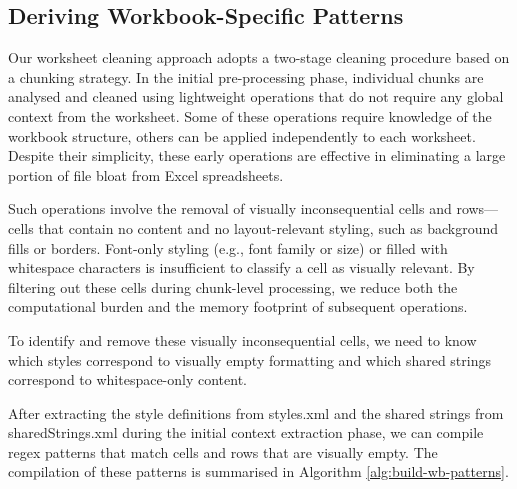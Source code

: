 \subsection{Deriving Workbook-Specific Patterns}
\label{sec:wb-patterns}


Our worksheet cleaning approach adopts a two-stage cleaning procedure based on a chunking strategy.
In the initial pre-processing phase, individual chunks are analysed
and cleaned using lightweight operations that do not require any global context
from the worksheet. Some of these operations require knowledge of the workbook structure,
others can be applied independently to each worksheet. Despite their simplicity,
these early operations are effective in eliminating a large portion of file bloat
from Excel spreadsheets.

Such operations involve the removal of visually inconsequential cells and rows—
cells that contain no content and no layout-relevant styling,
such as background fills or borders.
Font-only styling (e.g., font family or size) or filled  with
 whitespace characters  is insufficient to classify a cell as visually relevant.
By filtering out these cells during chunk-level processing,
we reduce both the computational burden and the memory footprint
of subsequent operations.

To identify and remove these visually inconsequential cells,
we need to know which styles correspond to visually empty formatting
and which shared strings correspond to whitespace-only content.

After extracting the style definitions from styles.xml
and the shared strings from sharedStrings.xml during the initial context extraction phase,
we can compile regex patterns that match cells and rows that are visually empty.
The  compilation of these patterns is summarised in Algorithm \ref{alg:build-wb-patterns}.

